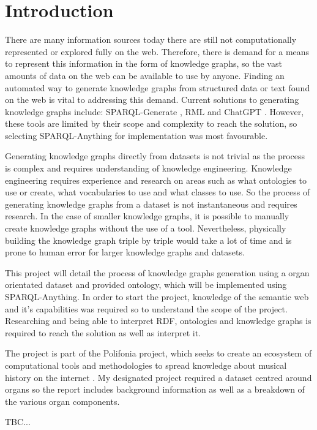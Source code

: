 \chapter{Introduction}
There are many information sources today there are still not computationally represented or explored fully on the web. Therefore, there is demand for a means to represent this information in the form of knowledge graphs, so the vast amounts of data on the web can be available to use by anyone. Finding an automated way to generate knowledge graphs from structured data or text found on the web is vital to addressing this demand. Current solutions to generating knowledge graphs include: SPARQL-Generate \cite{sparqlgenerate}, RML \cite{rml} and ChatGPT \cite{chatgptwebsite}. However, these tools are limited by their scope and complexity to reach the solution, so selecting SPARQL-Anything \cite{sparqlanythinggithub} for implementation was most favourable. 

Generating knowledge graphs directly from datasets is not trivial as the process is complex and requires understanding of knowledge engineering. Knowledge engineering requires experience and research on areas such as what ontologies to use or create, what vocabularies to use and what classes to use. So the process of generating knowledge graphs from a dataset is not instantaneous and requires research. In the case of smaller knowledge graphs, it is possible to manually create knowledge graphs without the use of a tool. Nevertheless, physically building the knowledge graph triple by triple would take a lot of time and is prone to human error for larger knowledge graphs and datasets. 

This project will detail the process of knowledge graphs generation using a organ orientated dataset and provided ontology, which will be implemented using SPARQL-Anything. In order to start the project, knowledge of the semantic web and it's capabilities was required so to understand the scope of the project. Researching and being able to interpret RDF, ontologies and knowledge graphs is required to reach the solution as well as interpret it. 

The project is part of the Polifonia project, which seeks to create an ecosystem of computational tools and methodologies to spread knowledge about musical history on the internet \cite{polifoniaproject}. My designated project required a dataset centred around organs so the report includes background information as well as a breakdown of the various organ components.

TBC...
